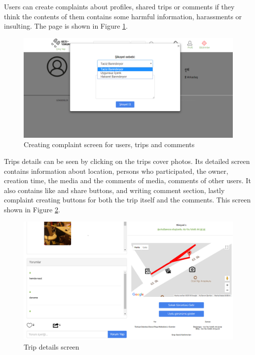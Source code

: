 Users can create complaints about profiles, shared trips or comments if they think the contents of them contains some harmful information, harassments or insulting. The page is shown in Figure \ref{fig:complaintPage}. 

\begin{figure}[!htbp]
\centering
\includegraphics[width=\textwidth]{projectChapters/images/complaintPage.png}
\caption{Creating complaint screen for users, trips and comments}
\label{fig:complaintPage}
\end{figure}

\newpage

Trips details can be seen by clicking on the trips cover photos. Its detailed screen contains information about location, persons who participated, the owner, creation time, the media and the comments of media, comments of other users. It also contains like and share buttons, and writing comment section, lastly complaint creating buttons for both the trip itself and the comments. 
This screen shown in Figure \ref{fig:tripDetail}. 

\begin{figure}[!htbp]
\centering
\includegraphics[scale= 0.4]{projectChapters/images/tripDetail.png}
\caption{Trip details screen}
\label{fig:tripDetail}
\end{figure}

